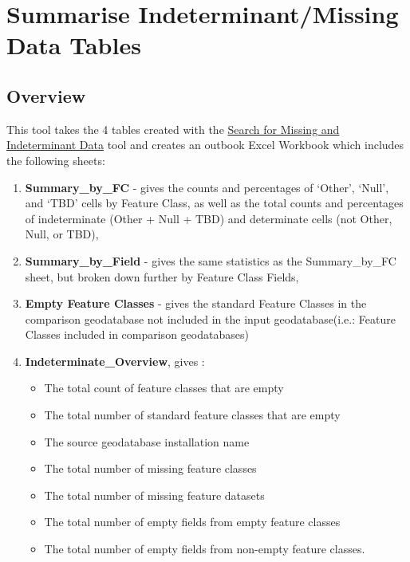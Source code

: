\documentclass[openany]{book}
\providecommand{\tightlist}{%
  \setlength{\itemsep}{0pt}\setlength{\parskip}{0pt}}
\theoremstyle{definition}
\theoremstyle{definition}
\theoremstyle{definition}
\theoremstyle{remark}
\begin{document}
\hypertarget{summIndt}{\chapter{Summarise Indeterminant/Missing Data
Tables}\label{summIndt}}

\section{Overview}\label{overview-9}

This tool takes the 4 tables created with the
\protect\hyperlink{indtSearch}{Search for Missing and Indeterminant
Data} tool and creates an outbook Excel Workbook which includes the
following sheets:

\begin{enumerate}
\def\labelenumi{\arabic{enumi}.}
\tightlist
\item
  \textbf{Summary\_by\_FC} - gives the counts and percentages of
  `Other', `Null', and `TBD' cells by Feature Class, as well as the
  total counts and percentages of indeterminate (Other + Null + TBD) and
  determinate cells (not Other, Null, or TBD),
\item
  \textbf{Summary\_by\_Field} - gives the same statistics as the
  Summary\_by\_FC sheet, but broken down further by Feature Class
  Fields,
\item
  \textbf{Empty Feature Classes} - gives the standard Feature Classes in
  the comparison geodatabase not included in the input geodatabase(i.e.:
  Feature Classes included in comparison geodatabases)
\item
  \textbf{Indeterminate\_Overview}, gives :

  \begin{itemize}
  \tightlist
  \item
    The total count of feature classes that are empty
  \item
    The total number of standard feature classes that are empty
  \item
    The source geodatabase installation name
  \item
    The total number of missing feature classes
  \item
    The total number of missing feature datasets
  \item
    The total number of empty fields from empty feature classes
  \item
    The total number of empty fields from non-empty feature classes.
  \end{itemize}
\end{enumerate}
\end{document}

